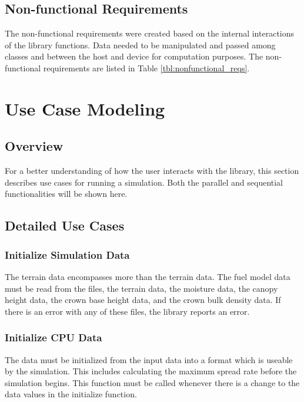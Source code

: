 \subsection{Non-functional Requirements}
The non-functional requirements were created based on the internal interactions of the library functions. Data needed to be manipulated and passed among classes and between the host and device for computation purposes. The non-functional requirements are listed in Table \ref{tbl:nonfunctional_reqs}.
  
\section{Use Case Modeling}
\subsection{Overview}
For a better understanding of how the user interacts with the library, this section describes use cases for running a simulation. Both the parallel and sequential functionalities will be shown here. 



\subsection{Detailed Use Cases}
\subsubsection{Initialize Simulation Data}
The terrain data encompasses more than the terrain data. The fuel model data must be read from the files, the terrain data, the moisture data, the canopy height data, the crown base height data, and the crown bulk density data. If there is an error with any of these files, the library reports an error. 

\subsubsection{Initialize CPU Data}
The data must be initialized from the input data into a format which is useable by the simulation. This includes calculating the maximum spread rate before the simulation begins. This function must be called whenever there is a change to the data values in the initialize function. 

